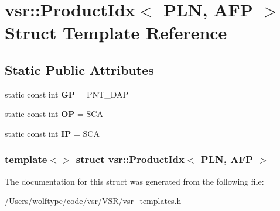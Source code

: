 \hypertarget{structvsr_1_1_product_idx_3_01_p_l_n_00_01_a_f_p_01_4}{\section{vsr\-:\-:Product\-Idx$<$ P\-L\-N, A\-F\-P $>$ Struct Template Reference}
\label{structvsr_1_1_product_idx_3_01_p_l_n_00_01_a_f_p_01_4}
}
\subsection*{Static Public Attributes}
\begin{DoxyCompactItemize}
\item 
\hypertarget{structvsr_1_1_product_idx_3_01_p_l_n_00_01_a_f_p_01_4_a40319b630656d66c33fadeb1e2c4056a}{static const int {\bfseries G\-P} = P\-N\-T\-\_\-\-D\-A\-P}\label{structvsr_1_1_product_idx_3_01_p_l_n_00_01_a_f_p_01_4_a40319b630656d66c33fadeb1e2c4056a}

\item 
\hypertarget{structvsr_1_1_product_idx_3_01_p_l_n_00_01_a_f_p_01_4_a0661affcd7d9905e3399bc5002cdb5dc}{static const int {\bfseries O\-P} = S\-C\-A}\label{structvsr_1_1_product_idx_3_01_p_l_n_00_01_a_f_p_01_4_a0661affcd7d9905e3399bc5002cdb5dc}

\item 
\hypertarget{structvsr_1_1_product_idx_3_01_p_l_n_00_01_a_f_p_01_4_a4dea7006149e05407b056d9080a918a3}{static const int {\bfseries I\-P} = S\-C\-A}\label{structvsr_1_1_product_idx_3_01_p_l_n_00_01_a_f_p_01_4_a4dea7006149e05407b056d9080a918a3}

\end{DoxyCompactItemize}
\subsubsection*{template$<$$>$ struct vsr\-::\-Product\-Idx$<$ P\-L\-N, A\-F\-P $>$}



The documentation for this struct was generated from the following file\-:\begin{DoxyCompactItemize}
\item 
/\-Users/wolftype/code/vsr/\-V\-S\-R/vsr\-\_\-templates.\-h\end{DoxyCompactItemize}
